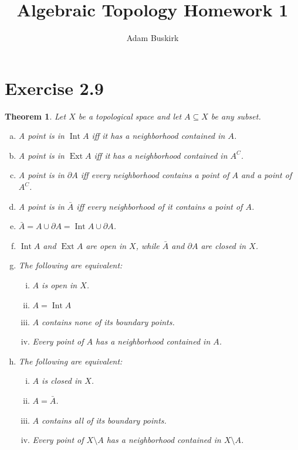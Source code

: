 \documentclass{article}
\title{Algebraic Topology Homework 1}
\author{Adam Buskirk}
\newtheorem{theorem}[subsection]{Theorem}
\theoremstyle{definition}
\begin{document}
\maketitle
\section{Exercise 2.9}
\begin{theorem}
Let $X$ be a topological space and let $A \subseteq X$ be any subset.
\begin{enumerate}[(a)]
\item A point is in $\operatorname{Int} A$ iff it has a neighborhood contained in $A$.
\item A point is in $\operatorname{Ext} A$ iff it has a neighborhood contained in $A^C$.
\item A point is in $\partial A$ iff every neighborhood contains a point of $A$ and a point of $A^C$.
\item A point is in $\bar{A}$ iff every neighborhood of it contains a point of $A$. 
\item $\bar{A} = A \cup \partial A = \operatorname{Int} A \cup \partial A$.
\item $\operatorname{Int} A$ and $\operatorname{Ext} A$ are open in $X$, while $\bar{A}$
    and $\partial A$ are closed in $X$.
\item The following are equivalent:
    \begin{enumerate}[(i)]
    \item $A$ is open in $X$.
    \item $A=\operatorname{Int} A$
    \item $A$ contains none of its boundary points.
    \item Every point of $A$ has a neighborhood contained in $A$.
    \end{enumerate}
\item The following are equivalent:
    \begin{enumerate}[(i)]
    \item $A$ is closed in $X$.
    \item $A=\bar{A}$.
    \item $A$ contains all of its boundary points.
    \item Every point of $X\setminus A$ has a neighborhood 
        contained in $X\setminus A$.
    \end{enumerate}
\end{enumerate}
\end{theorem}
\end{document}
